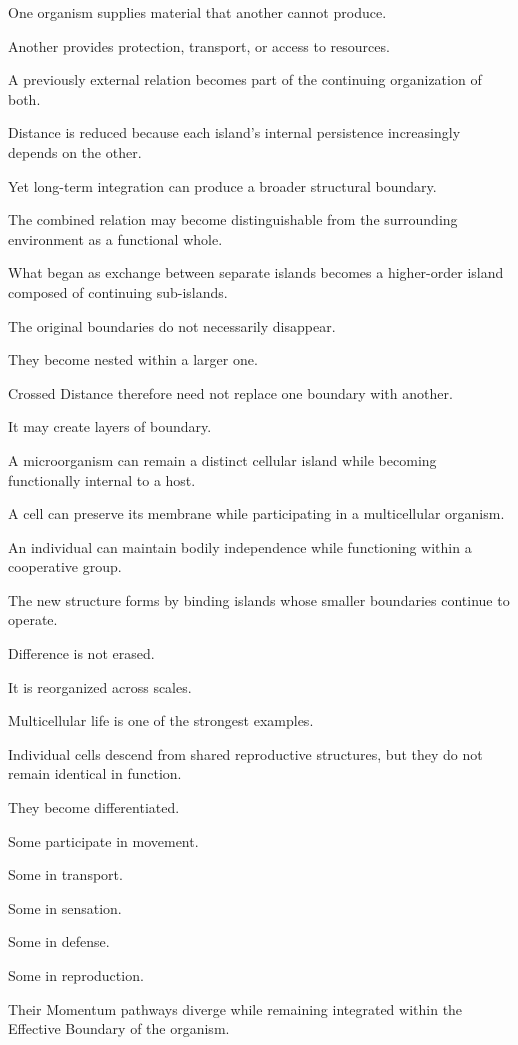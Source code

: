 One organism supplies material that another cannot produce.

Another provides protection, transport, or access to resources.

A previously external relation becomes part of the continuing organization of both.

Distance is reduced because each island’s internal persistence increasingly depends on the other.

Yet long-term integration can produce a broader structural boundary.

The combined relation may become distinguishable from the surrounding environment as a functional whole.

What began as exchange between separate islands becomes a higher-order island composed of continuing sub-islands.

The original boundaries do not necessarily disappear.

They become nested within a larger one.

Crossed Distance therefore need not replace one boundary with another.

It may create layers of boundary.

A microorganism can remain a distinct cellular island while becoming functionally internal to a host.

A cell can preserve its membrane while participating in a multicellular organism.

An individual can maintain bodily independence while functioning within a cooperative group.

The new structure forms by binding islands whose smaller boundaries continue to operate.

Difference is not erased.

It is reorganized across scales.

Multicellular life is one of the strongest examples.

Individual cells descend from shared reproductive structures, but they do not remain identical in function.

They become differentiated.

Some participate in movement.

Some in transport.

Some in sensation.

Some in defense.

Some in reproduction.

Their Momentum pathways diverge while remaining integrated within the Effective Boundary of the organism.


